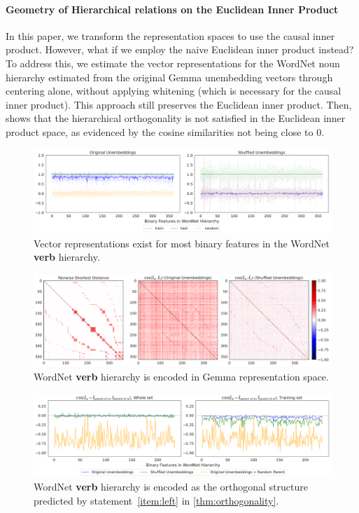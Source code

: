 \documentclass{article}
\begin{document}
\paragraph*{Geometry of Hierarchical relations on the Euclidean Inner Product}
In this paper, we transform the representation spaces to use the causal inner product.
However, what if we employ the naive Euclidean inner product instead?
To address this, we estimate the vector representations for the WordNet noun hierarchy estimated from the original Gemma unembedding vectors through centering alone, without applying whitening (which is necessary for the causal inner product). 
This approach still preserves the Euclidean inner product.
Then,  shows that the hierarchical orthogonality is not satisfied in the Euclidean inner product space, as evidenced by the cosine similarities not being close to 0.



\begin{figure}[t]
  \centering
  \includegraphics[width=1.0\linewidth]{figures/eval_lda_verb_gemma.pdf}
  \caption{Vector representations exist for most binary features in the WordNet \textbf{verb} hierarchy.}
  \label{fig:eval_lda_verb_gemma}
\end{figure}

\begin{figure}[t]
  \centering
  \includegraphics[width=1.0\linewidth]{figures/heatmap_verb_gemma.pdf}
  \caption{WordNet \textbf{verb} hierarchy is encoded in Gemma representation space.
  }
  \label{fig:heatmap_verb_gemma}
\end{figure}


\begin{figure}[t]
  \centering
  \includegraphics[width=1.0\linewidth]{figures/hier_ortho_b_verb_gemma.pdf}
  \caption{WordNet \textbf{verb} hierarchy is encoded as the orthogonal structure predicted by statement~\ref{item:left} in \cref{thm:orthogonality}.
  }
  \label{fig:hier_ortho_b_verb_gemma}
\end{figure}
\end{document}
